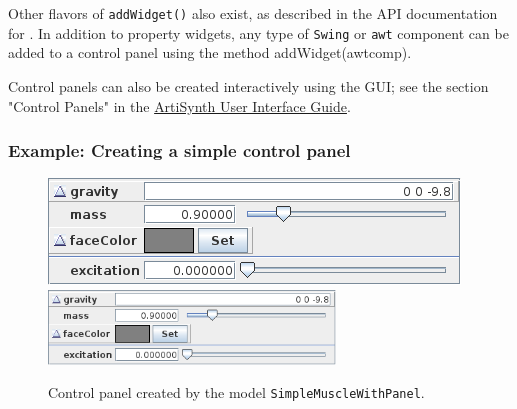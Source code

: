 Other flavors of {\tt addWidget()} also exist, as described in the API
documentation for .  In
addition to property widgets, any type of {\tt Swing} or {\tt awt}
component can be added to a control panel using the method
%
{addWidget(awtcomp)}.

Control panels can also be created interactively using the GUI; see
the section "Control Panels" in the
\href{http://www.artisynth.org/doc/html/uiguide/uiguide.html}{
ArtiSynth User Interface Guide}.

\subsubsection{Example: Creating a simple control panel}

\begin{figure}[t]
\begin{center}
\iflatexml
 \includegraphics[]{images/controlPanel}
\else
 \includegraphics[width=3in]{images/controlPanel}
\fi
\end{center}
\caption{Control panel created by the model {\tt SimpleMuscleWithPanel}.}
\label{controlPanel:fig}
\end{figure}

